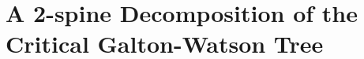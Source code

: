 \documentclass[UTF8]{pkuthss}
\theoremstyle{plain}
\newtheorem{thm}{Theorem}[section]
\theoremstyle{definition}
\numberwithin{equation}{section}
\begin{document}
\chapter{A 2-spine Decomposition of the Critical Galton-Watson Tree}
\begin{comment}
\section{Introduction}
\subsection{Model}
\label{sec:model}
Consider a critical Galton-Watson process
$(Z_n)_{n\ge 0}$ 	with $Z_0 = 1$
and offspring distribution $\mu$ on $\mathbb N_0 : = \{0,1,\dots\}$ which has mean $1$ and finite variance $\sigma^2>0$, i.e.,
\begin{equation}\label{eq:mean}
\sum_{k=0}^\infty k \mu(k)	=1
\end{equation}
and
\begin{equation}\label{eq:variance}
0	
<	\sigma^2
:=	\sum_{k=0}^\infty  (k-1)^2 \mu(k)
=	\sum_{k=0}^\infty k(k-1) \mu(k)
<	\infty.
\end{equation}
For simplicity,
we will refer to $(Z_n)_{n\geq 0}$ as a  \emph{$\mu$-Galton-Watson process}.
It is well known that
\begin{thm}[\cite{KestenNeySpitzer1966GaltonWatson}] 
\label{thm: Kolmogorov and Yaglom theorem}
	For a $\mu$-Galton-Watson process $(Z_n)_{n\geq 0}$
	satisfying \eqref{eq:mean} and \eqref{eq:variance}, we have
	\begin{enumerate}
		\item \label{thm:Kolmogorov}
		$n P (Z_n>0) \xrightarrow[n \to \infty]{} 2/\sigma^2;$
		\item \label{thm:Yaglom}
		$\{n^{-1}Z_n; P(\cdot | Z_n>0)\}\xrightarrow[n \to \infty]{d} Y,$
	\end{enumerate}
	where $Y$ is an exponential random variable with mean $\sigma^2/2$.
\end{thm}

Under a third moment assumption, assertions \eqref{thm:Kolmogorov} and \eqref{thm:Yaglom} of Theorem \ref{thm: Kolmogorov and Yaglom theorem} are due to \cite{Kolmogorov1938Zur} and \cite{Yaglom1947Certain} respectively.
Theorem \ref{thm: Kolmogorov and Yaglom theorem}(2) is usually called Yaglom's theorem.
For probabilistic proofs of the above results, we refer our readers to
\cite{Geiger1999Elementary}, \cite{Geiger2000New} and \cite{LyonsPemantlePeres1995Conceptual}.


\end{comment}
\end{document}
